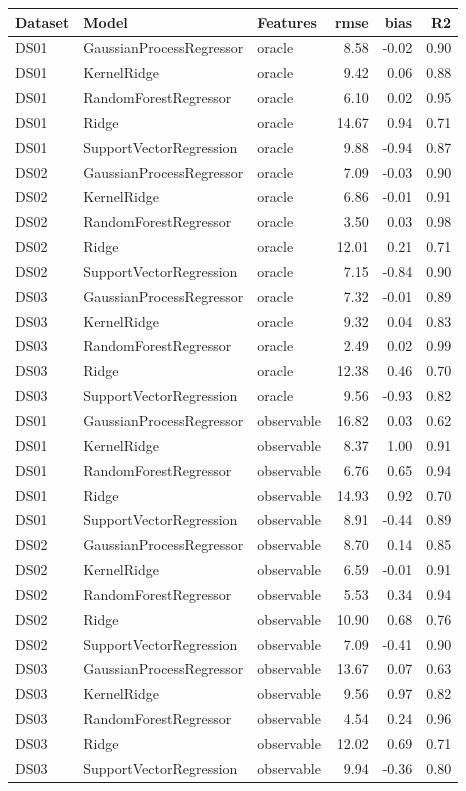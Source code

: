 \begin{tabular}{lllrrr}
\toprule
Dataset & Model & Features & rmse & bias & R2 \\
\midrule
DS01 & GaussianProcessRegressor & oracle & 8.58 & -0.02 & 0.90 \\
DS01 & KernelRidge & oracle & 9.42 & 0.06 & 0.88 \\
DS01 & RandomForestRegressor & oracle & 6.10 & 0.02 & 0.95 \\
DS01 & Ridge & oracle & 14.67 & 0.94 & 0.71 \\
DS01 & SupportVectorRegression & oracle & 9.88 & -0.94 & 0.87 \\
DS02 & GaussianProcessRegressor & oracle & 7.09 & -0.03 & 0.90 \\
DS02 & KernelRidge & oracle & 6.86 & -0.01 & 0.91 \\
DS02 & RandomForestRegressor & oracle & 3.50 & 0.03 & 0.98 \\
DS02 & Ridge & oracle & 12.01 & 0.21 & 0.71 \\
DS02 & SupportVectorRegression & oracle & 7.15 & -0.84 & 0.90 \\
DS03 & GaussianProcessRegressor & oracle & 7.32 & -0.01 & 0.89 \\
DS03 & KernelRidge & oracle & 9.32 & 0.04 & 0.83 \\
DS03 & RandomForestRegressor & oracle & 2.49 & 0.02 & 0.99 \\
DS03 & Ridge & oracle & 12.38 & 0.46 & 0.70 \\
DS03 & SupportVectorRegression & oracle & 9.56 & -0.93 & 0.82 \\
DS01 & GaussianProcessRegressor & observable & 16.82 & 0.03 & 0.62 \\
DS01 & KernelRidge & observable & 8.37 & 1.00 & 0.91 \\
DS01 & RandomForestRegressor & observable & 6.76 & 0.65 & 0.94 \\
DS01 & Ridge & observable & 14.93 & 0.92 & 0.70 \\
DS01 & SupportVectorRegression & observable & 8.91 & -0.44 & 0.89 \\
DS02 & GaussianProcessRegressor & observable & 8.70 & 0.14 & 0.85 \\
DS02 & KernelRidge & observable & 6.59 & -0.01 & 0.91 \\
DS02 & RandomForestRegressor & observable & 5.53 & 0.34 & 0.94 \\
DS02 & Ridge & observable & 10.90 & 0.68 & 0.76 \\
DS02 & SupportVectorRegression & observable & 7.09 & -0.41 & 0.90 \\
DS03 & GaussianProcessRegressor & observable & 13.67 & 0.07 & 0.63 \\
DS03 & KernelRidge & observable & 9.56 & 0.97 & 0.82 \\
DS03 & RandomForestRegressor & observable & 4.54 & 0.24 & 0.96 \\
DS03 & Ridge & observable & 12.02 & 0.69 & 0.71 \\
DS03 & SupportVectorRegression & observable & 9.94 & -0.36 & 0.80 \\
\bottomrule
\end{tabular}
